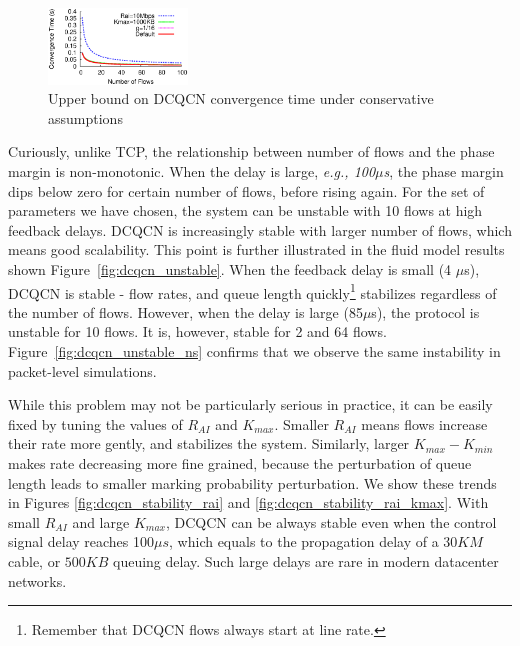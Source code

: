\begin{figure}[t]
\centering
\includegraphics[width=0.33\textwidth]{figures/dcqcn_convergence_time.eps}
\vspace{-1em}
\caption{Upper bound on DCQCN convergence time under conservative assumptions}
\vspace{-1em}
\label{fig:dcqcn_convergence_time}
\end{figure}


Curiously, unlike TCP, the relationship between number of flows and the phase
margin is non-monotonic. When the delay is large, {\em e.g., 100$\mu$s}, the
phase margin dips below zero for certain number of flows, before rising again.
For the set of parameters we have chosen, the system can be unstable with 10
flows at high feedback delays.  DCQCN is increasingly stable with larger number
of flows, which means good scalability. This point is further illustrated in the
fluid model results shown Figure~\ref{fig:dcqcn_unstable}. When the feedback
delay is small (4 $\mu$s), DCQCN is stable - flow rates, and queue length
quickly\footnote{Remember that DCQCN flows always start at line rate.}
stabilizes regardless of the number of flows. However, when the delay is large
(85$\mu$s), the protocol is unstable for 10 flows. It is, however, stable for 2
and 64 flows. Figure~\ref{fig:dcqcn_unstable_ns} confirms that we observe the
same instability in packet-level simulations.

While this problem may not be particularly serious in practice, it can be easily 
fixed by tuning the values of $R_{AI}$ and $K_{max}$.  Smaller $R_{AI}$
means flows increase their rate more gently, and stabilizes the system.
Similarly, larger $K_{max} - K_{min}$ makes rate decreasing more fine grained,
because the perturbation of queue length leads to smaller marking probability
perturbation. We show these trends in Figures \ref{fig:dcqcn_stability_rai} and
\ref{fig:dcqcn_stability_rai_kmax}.  With small $R_{AI}$ and large $K_{max}$,
DCQCN can be always stable even when the control signal delay reaches 100$\mu
s$, which equals to the propagation delay of a $30KM$ cable, or $500KB$ queuing
delay. Such large delays are rare in modern datacenter networks. 

